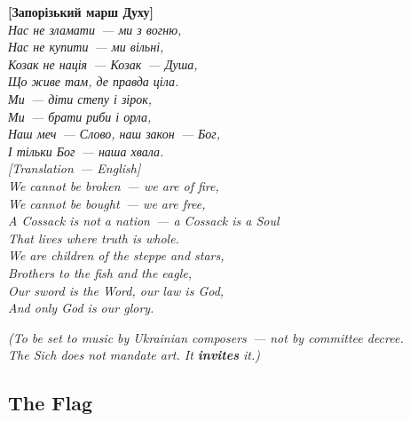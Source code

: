 \documentclass[11pt,a4paper]{article}
\theoremstyle{definition}
\theoremstyle{remark}
\begin{document}
\begin{sichbox}

\foreignlanguage{russian}{
\textbf{[Запорізький марш Духу]}\\[0.2cm]
\textit{Нас не зламати~--- ми з вогню,}\\
\textit{Нас не купити~--- ми вільні,}\\
\textit{Козак не нація~--- Козак~--- Душа,}\\
\textit{Що живе там, де правда ціла.}\\[0.2cm]
\textit{Ми~--- діти степу і зірок,}\\
\textit{Ми~--- брати риби і орла,}\\
\textit{Наш меч~--- Слово, наш закон~--- Бог,}\\
\textit{І тільки Бог~--- наша хвала.}\\[0.2cm]
}
\textit{[Translation~--- English]}\\[0.1cm]
\textit{We cannot be broken~--- we are of fire,}\\
\textit{We cannot be bought~--- we are free,}\\
\textit{A Cossack is not a nation~--- a Cossack is a Soul}\\
\textit{That lives where truth is whole.}\\[0.2cm]
\textit{We are children of the steppe and stars,}\\
\textit{Brothers to the fish and the eagle,}\\
\textit{Our sword is the Word, our law is God,}\\
\textit{And only God is our glory.}\\[0.3cm]
\begin{center}
\small\textit{(To be set to music by Ukrainian composers~---
not by committee decree.\\
The Sich does not mandate art. It \textbf{invites} it.)}
\end{center}
\end{sichbox}

\subsection{The Flag}
\label{sec:sich-flag}
\end{document}
